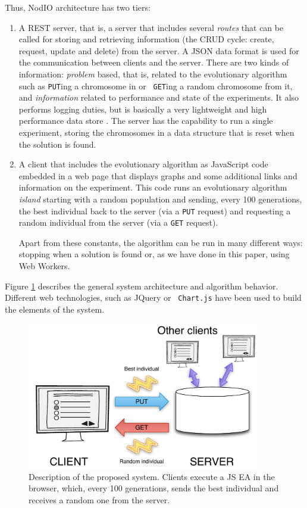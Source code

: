 \documentclass[journal,onecolumn]{IEEEtran}
\begin{document}


Thus, {\sf NodIO} architecture has two tiers:\begin{enumerate}
\item A REST server, that is, a server that includes several {\em
  routes} 
  that can be called for storing and retrieving information (the CRUD cycle:
  create, request, update and delete) from the server. 
  A JSON data format is used for the communication between 
  clients and the server. There are two kinds of information:
  {\em problem} based, that is, related to the
  evolutionary algorithm such as {\tt PUT}ing a chromosome in or {\tt
  GET}ing a random chromosome from it, and {\em information} related
  to performance and state of the experiments. It also performs logging
  duties, but is basically a very lightweight and high performance
  data store \cite{jj:idc:lowcost}.
  The server has the capability to
  run a single experiment, storing the chromosomes in a data structure
  that is reset when the solution is found.
\item A client that includes the evolutionary algorithm as
  JavaScript code embedded in a web page that displays graphs and some
  additional links and information on the experiment. This code runs
  an evolutionary algorithm {\em island} starting with a random
  population and sending, every 100 generations, the best individual
  back to the server (via a {\tt PUT} request) and requesting a random
  individual from the server (via a {\tt GET} request).



  Apart from
  these constants, the algorithm can be run in many different ways:
  stopping when a solution is found or, as we have done in this paper,
  using Web Workers. 
\end{enumerate}

Figure \ref{fig:system} describes the general system architecture and
algorithm behavior. Different web technologies, such as JQuery or {\tt
  Chart.js} have
been used to build the elements of the system.
\begin{figure}[!t]
\centering
\includegraphics[width=4in]{system.pdf}
\caption{Description of the proposed system. Clients execute a JS EA
  in the browser, which, every 100 generations, sends the best
  individual and receives a random one from the server. }
\label{fig:system}
\end{figure}
\end{document}
